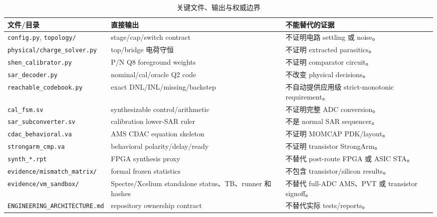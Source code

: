 \documentclass[UTF8,11pt,a4paper]{ctexart}
\newcommand{\code}[1]{\texttt{\small #1}}
\newcommand{\pathcode}[1]{{\small\nolinkurl{#1}}}
\newcommand{\tablehead}{\rowcolor{PaleBlue}\bfseries\sffamily\color{DeepNavy}}
\begin{document}
\begin{table}[htbp]
\centering
\caption{关键文件、输出与权威边界}
\footnotesize
\begin{tabularx}{\textwidth}{@{}p{44mm}p{45mm}Y@{}}
  \toprule
  \tablehead 文件/目录 & 直接输出 & 不能替代的证据\\
  \midrule
  \code{config.py}, \code{topology/} &
    stage/cap/switch contract &
    不证明电路 settling 或 noise。\\
  \pathcode{physical/charge_solver.py} &
    top/bridge 电荷守恒 &
    不证明 extracted parasitics。\\
  \code{shen\_calibrator.py} &
    P/N Q8 foreground weights &
    不证明 comparator circuit。\\
  \code{sar\_decoder.py} &
    nominal/cal/oracle Q2 code &
    不改变 physical decisions。\\
  \pathcode{reachable_codebook.py} &
    exact DNL/INL/missing/backstep &
    不自动提供应用级 strict-monotonic requirement。\\
  \code{cal\_fsm.sv} &
    synthesizable control/arithmetic &
    不证明完整 ADC conversion。\\
  \pathcode{sar_subconverter.sv} &
    calibration lower-SAR ruler &
    不是 normal SAR sequencer。\\
  \code{cdac\_behavioral.va} &
    AMS CDAC equation skeleton &
    不证明 MOMCAP PDK/layout。\\
  \code{strongarm\_cmp.va} &
    behavioral polarity/delay/ready &
    不证明 transistor StrongArm。\\
  \code{synth\_*.rpt} &
    FPGA synthesis proxy &
    不替代 post-route FPGA 或 ASIC STA。\\
  \pathcode{evidence/mismatch_matrix/} &
    formal frozen statistics &
    不包含 transistor/silicon results。\\
  \pathcode{evidence/vm_sandbox/} &
    Spectre/Xcelium standalone status、TB、runner 和 hashes &
    不替代 full-ADC AMS、PVT 或 transistor signoff。\\
  \pathcode{ENGINEERING_ARCHITECTURE.md} &
    repository ownership contract &
    不替代实际 tests/reports。\\
  \bottomrule
\end{tabularx}
\end{table}
\end{document}
